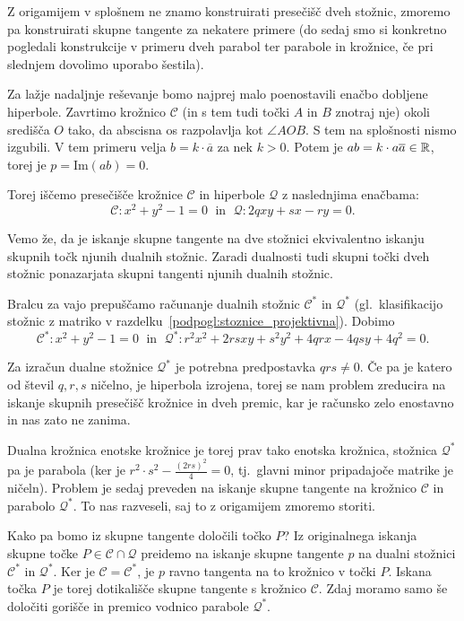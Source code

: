 Z origamijem v splošnem ne znamo konstruirati presečišč dveh stožnic, zmoremo pa konstruirati skupne tangente za nekatere primere (do sedaj smo si konkretno pogledali konstrukcije v primeru dveh parabol ter parabole in krožnice, če pri slednjem dovolimo uporabo šestila).

Za lažje nadaljnje reševanje bomo najprej malo poenostavili enačbo dobljene hiperbole. Zavrtimo krožnico $\mathcal{C}$ (in s tem tudi točki $A$ in $B$ znotraj nje) okoli središča $O$ tako, da abscisna os razpolavlja kot $\angle AOB$. S tem na splošnosti nismo izgubili. V tem primeru velja $b = k \cdot \overline{a}$ za nek $k > 0$. Potem je $ab = k \cdot a \overline{a} \in \mathbb R$, torej je $p = \mathrm{Im}(ab) = 0$.

Torej iščemo presečišče krožnice $\mathcal{C}$ in hiperbole $\mathcal{Q}$ z naslednjima enačbama:
$$ \mathcal{C}: x^2 + y^2 - 1 = 0 \; \text{ in } \; \mathcal{Q}: 2qxy + sx - ry = 0. $$

Vemo že, da je iskanje skupne tangente na dve stožnici ekvivalentno iskanju skupnih točk njunih dualnih stožnic. Zaradi dualnosti tudi skupni točki dveh stožnic ponazarjata skupni tangenti njunih dualnih stožnic.

Bralcu za vajo prepuščamo računanje dualnih stožnic $\mathcal{C^*}$ in $\mathcal{Q^*}$ (gl.\ klasifikacijo stožnic z matriko v razdelku~\ref{podpogl:stoznice_projektivna}). Dobimo
$$ \mathcal{C^*}: x^2 + y^2 - 1 = 0 \; \text{ in } \; \mathcal{Q^*}: r^2x^2 + 2rsxy + s^2y^2 + 4qrx - 4qsy + 4q^2 = 0. $$

\begin{opomba}
    Za izračun dualne stožnice $\mathcal{Q^*}$ je potrebna predpostavka $qrs \neq 0$. Če pa je katero od števil $q, r, s$ ničelno, je hiperbola izrojena, torej se nam problem zreducira na iskanje skupnih presečišč krožnice in dveh premic, kar je računsko zelo enostavno in nas zato ne zanima.
\end{opomba}

Dualna krožnica enotske krožnice je torej prav tako enotska krožnica, stožnica $\mathcal{Q^*}$ pa je parabola (ker je $r^2 \cdot s^2 - \frac{(2rs)^2}{4} = 0$, tj.\ glavni minor pripadajoče matrike je ničeln). Problem je sedaj preveden na iskanje skupne tangente na krožnico $\mathcal{C}$ in parabolo $\mathcal{Q^*}$. To nas razveseli, saj to z origamijem zmoremo storiti.

Kako pa bomo iz skupne tangente določili točko $P$? Iz originalnega iskanja skupne točke $P \in \mathcal{C} \cap \mathcal{Q}$ preidemo na iskanje skupne tangente $p$ na dualni stožnici $\mathcal{C^*}$ in $\mathcal{Q^*}$. Ker je $\mathcal{C} = \mathcal{C^*}$, je $p$ ravno tangenta na to krožnico v točki $P$. Iskana točka $P$ je torej dotikališče skupne tangente s krožnico $\mathcal{C}$. Zdaj moramo samo še določiti gorišče in premico vodnico parabole $\mathcal{Q^*}$.


